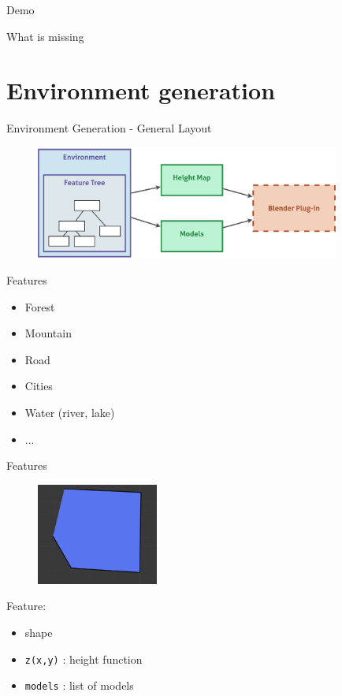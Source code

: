 \documentclass{beamer}
\begin{document}
\begin{frame}{Demo}
\end{frame}

\begin{frame}{What is missing}
\end{frame}

\section{Environment generation}
\begin{frame}{Environment Generation - General Layout}
  \begin{figure}
    \begin{center}
      \includegraphics[width=10cm]{env_global.pdf}
    \end{center}
  \end{figure}
\end{frame}

\begin{frame}{Features}
  \begin{itemize}
    \item Forest
    \item Mountain
    \item Road
    \item Cities
    \item Water (river, lake)
    \item ...
  \end{itemize}
\end{frame}

\begin{frame}{Features}
  \begin{figure}
    \begin{center}
      \includegraphics[width=4cm]{feature}
    \end{center}
  \end{figure}
  Feature:
  \begin{itemize}
    \item {\color{Cerulean}shape}
    \item \texttt{z(x,y)} : height function
    \item \texttt{models} : list of models
  \end{itemize}
\end{frame}
\end{document}
